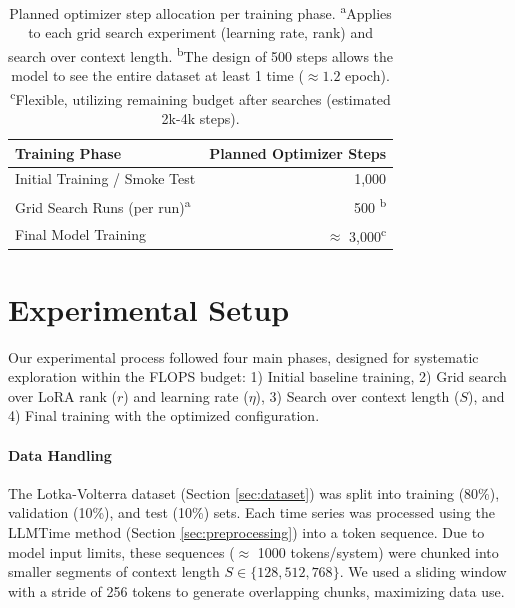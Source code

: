 \documentclass{article}
\begin{document}
\begin{table}[!htbp]
\renewcommand{\arraystretch}{1.4} \centering \setlength{\tabcolsep}{8pt}
\begin{tabular}{@{}lr@{}}
    \toprule \textbf{Training Phase} & \textbf{Planned Optimizer Steps} \\ \midrule
    Initial Training / Smoke Test & 1,000 \\
    Grid Search Runs (per run)\textsuperscript{a} & 500 \textsuperscript{b} \\
    Final Model Training & $\approx$ 3,000\textsuperscript{c} \\
    \bottomrule
\end{tabular}
\caption{Planned optimizer step allocation per training phase. \newline
\textsuperscript{a}Applies to each grid search experiment (learning rate, rank) and search over context length. \newline
\textsuperscript{b}The design of 500 steps allows the model to see the entire dataset at least 1 time ($\approx 1.2$ epoch). \newline
\textsuperscript{c}Flexible, utilizing remaining budget after searches (estimated 2k-4k steps).} \label{tab:training_steps}
\end{table}



\section{Experimental Setup}
\label{sec:setup}

Our experimental process followed four main phases, designed for systematic exploration within the FLOPS budget: 1) Initial baseline training, 2) Grid search over LoRA rank ($r$) and learning rate ($\eta$), 3) Search over context length ($S$), and 4) Final training with the optimized configuration.

\paragraph{Data Handling}
\label{sec:data-handling}
The Lotka-Volterra dataset (Section \ref{sec:dataset}) was split into training (80\%), validation (10\%), and test (10\%) sets. Each time series was processed using the LLMTime method (Section \ref{sec:preprocessing}) into a token sequence. Due to model input limits, these sequences ($\approx$ 1000 tokens/system) were chunked into smaller segments of context length $S \in \{128, 512, 768\}$. We used a sliding window with a stride of 256 tokens to generate overlapping chunks, maximizing data use.
\end{document}
